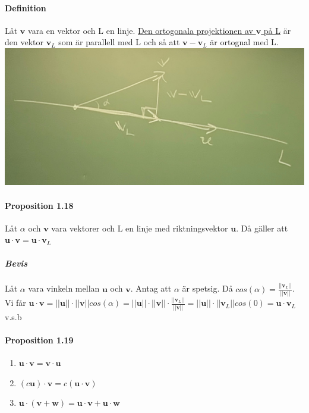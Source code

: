     \paragraph{Definition} Låt $\bm{v}$ vara en vektor och L en linje. 
    \underline{Den ortogonala projektionen av $\bm{v}$ på L} är den vektor $\bm{v}_{L}$ som är parallell med L och så att $\bm{v}-\bm{v}_{L}$ är ortognal med L.\\
    \includegraphics[scale=0.15]{imgs/22-01-20-img04.jpg}
    
    \paragraph{Proposition 1.18} Låt $\alpha$ och $\bm{v}$ vara vektorer och L en linje med riktningsvektor $\bm{u}$. 
    Då gäller att $\bm{u}\cdot \bm{v} = \bm{u} \cdot \bm{v}_{L}$
    \subparagraph{Bevis} Låt $\alpha$ vara vinkeln mellan $\bm{u}$ och $\bm{v}$.
    Antag att $\alpha$ är spetsig. Då $cos(\alpha)=\frac{||\bm{v}_{L}||}{||\bm{v}||}$.\\
    Vi får $\bm{u}\cdot \bm{v}=||\bm{u}||\cdot ||\bm{v}||cos(\alpha) = ||\bm{u}||\cdot ||\bm{v}||\cdot \frac{||\bm{v}_{L}||}{||\bm{v}||}=||\bm{u}||\cdot ||\bm{v}_{L}||cos(0)=\bm{u}\cdot\bm{v}_{L}$ v.s.b
    
    \paragraph{Proposition 1.19}
    \begin{enumerate}
        \item $\bm{u}\cdot \bm{v}=\bm{v}\cdot \bm{u}$
        \item $(c\bm{u})\cdot \bm{v} = c(\bm{u}\cdot \bm{v})$
        \item $\bm{u}\cdot (\bm{v} + \bm{w}) = \bm{u}\cdot \bm{v} + \bm{u} \cdot \bm{w}$
    \end{enumerate}
    
